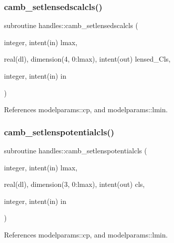 \mbox{\label{namespacehandles_a670ac8cb259c4983bc0cb16b053252b7}} 
\subsubsection{\texorpdfstring{camb\+\_\+setlensedscalcls()}{camb\_setlensedscalcls()}}
{\footnotesize\ttfamily subroutine handles\+::camb\+\_\+setlensedscalcls (\begin{DoxyParamCaption}\item[{integer, intent(in)}]{lmax,  }\item[{real(dl), dimension(4, 0\+:lmax), intent(out)}]{lensed\+\_\+\+Cls,  }\item[{integer, intent(in)}]{in }\end{DoxyParamCaption})}



References modelparams\+::cp, and modelparams\+::lmin.

\mbox{\label{namespacehandles_ae3fb31c2363d57d05718b6cb9bc6bf5d}} 
\subsubsection{\texorpdfstring{camb\+\_\+setlenspotentialcls()}{camb\_setlenspotentialcls()}}
{\footnotesize\ttfamily subroutine handles\+::camb\+\_\+setlenspotentialcls (\begin{DoxyParamCaption}\item[{integer, intent(in)}]{lmax,  }\item[{real(dl), dimension(3, 0\+:lmax), intent(out)}]{cls,  }\item[{integer, intent(in)}]{in }\end{DoxyParamCaption})}



References modelparams\+::cp, and modelparams\+::lmin.

\mbox{\label{namespacehandles_a85a90c13c4ff2c1dc02dd5b6c6c8da9d}} 
